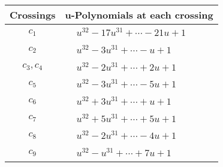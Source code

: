 \documentclass[1p]{elsarticle_modified}
\theoremstyle{definition}
\begin{document}
\begin{tabular}{m{50pt}|m{274pt}}
Crossings & \hspace{64pt}u-Polynomials at each crossing \\
\hline $$\begin{aligned}c_{1}\end{aligned}$$&$\begin{aligned}
&u^{32}-17 u^{31}+\cdots-21 u+1
\end{aligned}$\\
\hline $$\begin{aligned}c_{2}\end{aligned}$$&$\begin{aligned}
&u^{32}-3 u^{31}+\cdots- u+1
\end{aligned}$\\
\hline $$\begin{aligned}c_{3},c_{4}\end{aligned}$$&$\begin{aligned}
&u^{32}-2 u^{31}+\cdots+2 u+1
\end{aligned}$\\
\hline $$\begin{aligned}c_{5}\end{aligned}$$&$\begin{aligned}
&u^{32}-3 u^{31}+\cdots-5 u+1
\end{aligned}$\\
\hline $$\begin{aligned}c_{6}\end{aligned}$$&$\begin{aligned}
&u^{32}+3 u^{31}+\cdots+u+1
\end{aligned}$\\
\hline $$\begin{aligned}c_{7}\end{aligned}$$&$\begin{aligned}
&u^{32}+5 u^{31}+\cdots+5 u+1
\end{aligned}$\\
\hline $$\begin{aligned}c_{8}\end{aligned}$$&$\begin{aligned}
&u^{32}-2 u^{31}+\cdots-4 u+1
\end{aligned}$\\
\hline $$\begin{aligned}c_{9}\end{aligned}$$&$\begin{aligned}
&u^{32}- u^{31}+\cdots+7 u+1
\end{aligned}$\\

\end{tabular}
\end{document}
